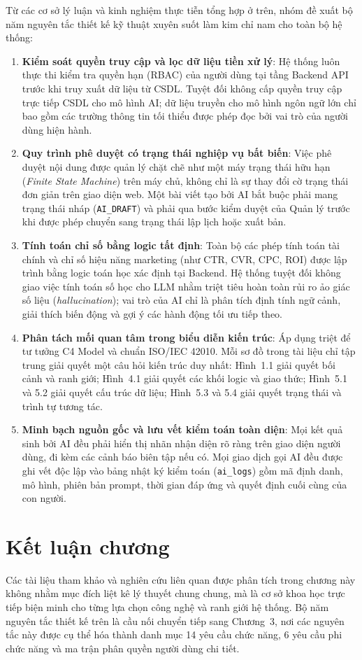 Từ các cơ sở lý luận và kinh nghiệm thực tiễn tổng hợp ở trên, nhóm đề xuất bộ năm nguyên tắc thiết kế kỹ thuật xuyên suốt làm kim chỉ nam cho toàn bộ hệ thống:

\begin{enumerate}
\item \textbf{Kiểm soát quyền truy cập và lọc dữ liệu tiền xử lý}: Hệ thống luôn thực thi kiểm tra quyền hạn (RBAC) của người dùng tại tầng Backend API trước khi truy xuất dữ liệu từ CSDL. Tuyệt đối không cấp quyền truy cập trực tiếp CSDL cho mô hình AI; dữ liệu truyền cho mô hình ngôn ngữ lớn chỉ bao gồm các trường thông tin tối thiểu được phép đọc bởi vai trò của người dùng hiện hành.
\item \textbf{Quy trình phê duyệt có trạng thái nghiệp vụ bất biến}: Việc phê duyệt nội dung được quản lý chặt chẽ như một máy trạng thái hữu hạn (\textit{Finite State Machine}) trên máy chủ, không chỉ là sự thay đổi cờ trạng thái đơn giản trên giao diện web. Một bài viết tạo bởi AI bắt buộc phải mang trạng thái nháp (\texttt{AI\_DRAFT}) và phải qua bước kiểm duyệt của Quản lý trước khi được phép chuyển sang trạng thái lập lịch hoặc xuất bản.
\item \textbf{Tính toán chỉ số bằng logic tất định}: Toàn bộ các phép tính toán tài chính và chỉ số hiệu năng marketing (như CTR, CVR, CPC, ROI) được lập trình bằng logic toán học xác định tại Backend. Hệ thống tuyệt đối không giao việc tính toán số học cho LLM nhằm triệt tiêu hoàn toàn rủi ro ảo giác số liệu (\textit{hallucination}); vai trò của AI chỉ là phân tích định tính ngữ cảnh, giải thích biến động và gợi ý các hành động tối ưu tiếp theo.
\item \textbf{Phân tách mối quan tâm trong biểu diễn kiến trúc}: Áp dụng triệt để tư tưởng C4 Model và chuẩn ISO/IEC 42010. Mỗi sơ đồ trong tài liệu chỉ tập trung giải quyết một câu hỏi kiến trúc duy nhất: Hình~1.1 giải quyết bối cảnh và ranh giới; Hình~4.1 giải quyết các khối logic và giao thức; Hình~5.1 và 5.2 giải quyết cấu trúc dữ liệu; Hình~5.3 và 5.4 giải quyết trạng thái và trình tự tương tác.
\item \textbf{Minh bạch nguồn gốc và lưu vết kiểm toán toàn diện}: Mọi kết quả sinh bởi AI đều phải hiển thị nhãn nhận diện rõ ràng trên giao diện người dùng, đi kèm các cảnh báo biên tập nếu có. Mọi giao dịch gọi AI đều được ghi vết độc lập vào bảng nhật ký kiểm toán (\texttt{ai\_logs}) gồm mã định danh, mô hình, phiên bản prompt, thời gian đáp ứng và quyết định cuối cùng của con người.
\end{enumerate}

\section{Kết luận chương}

Các tài liệu tham khảo và nghiên cứu liên quan được phân tích trong chương này không nhằm mục đích liệt kê lý thuyết chung chung, mà là cơ sở khoa học trực tiếp biện minh cho từng lựa chọn công nghệ và ranh giới hệ thống. Bộ năm nguyên tắc thiết kế trên là cầu nối chuyển tiếp sang Chương~3, nơi các nguyên tắc này được cụ thể hóa thành danh mục 14 yêu cầu chức năng, 6 yêu cầu phi chức năng và ma trận phân quyền người dùng chi tiết.
